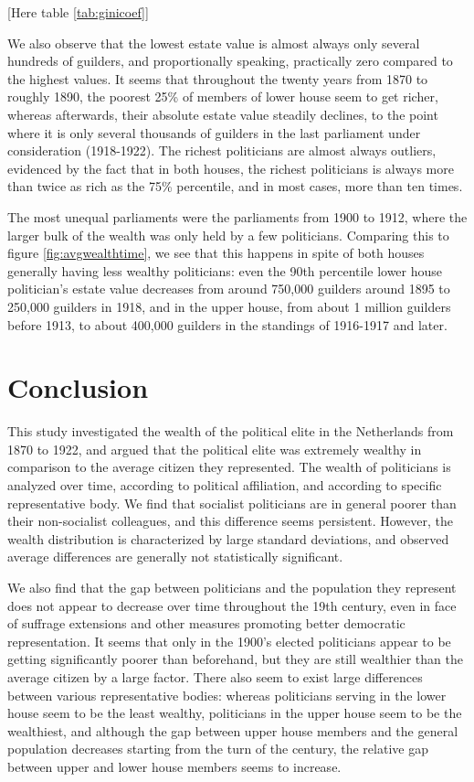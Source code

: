     \begin{center}
        [Here table \ref{tab:ginicoef}]
    \end{center}
    
    We also observe that the lowest estate value is almost always only several hundreds of guilders, and proportionally speaking, practically zero compared to the highest values. It seems that throughout the twenty years from 1870 to roughly 1890, the poorest 25\% of members of lower house seem to get richer, whereas afterwards, their absolute estate value steadily declines, to the point where it is only several thousands of guilders in the last parliament under consideration (1918-1922). The richest politicians are almost always outliers, evidenced by the fact that in both houses, the richest politicians is always more than twice as rich as the 75\% percentile, and in most cases, more than ten times. 
    
    The most unequal parliaments were the parliaments from 1900 to 1912, where the larger bulk of the wealth was only held by a few politicians. Comparing this to figure \ref{fig:avgwealthtime}, we see that this happens in spite of both houses generally having less wealthy politicians: even the 90th percentile lower house politician's estate value decreases from around 750,000 guilders around 1895 to 250,000 guilders in 1918, and in the upper house, from about 1 million guilders before 1913, to about 400,000 guilders in the standings of 1916-1917 and later. 
    

\section{Conclusion}

    This study investigated the wealth of the political elite in the Netherlands from 1870 to 1922, and argued that the political elite was extremely wealthy in comparison to the average citizen they represented. The wealth of politicians is analyzed over time, according to political affiliation, and according to specific representative body. We find that socialist politicians are in general poorer than their non-socialist colleagues, and this difference seems persistent. However, the wealth distribution is characterized by large standard deviations, and observed average differences are generally not statistically significant. 

    We also find that the gap between politicians and the population they represent does not appear to decrease over time throughout the 19th century, even in face of suffrage extensions and other measures promoting better democratic representation. It seems that only in the 1900's elected politicians appear to be getting significantly poorer than beforehand, but they are still wealthier than the average citizen by a large factor. There also seem to exist large differences between various representative bodies: whereas politicians serving in the lower house seem to be the least wealthy, politicians in the upper house seem to be the wealthiest, and although the gap between upper house members and the general population decreases starting from the turn of the century, the relative gap between upper and lower house members seems to increase. 

